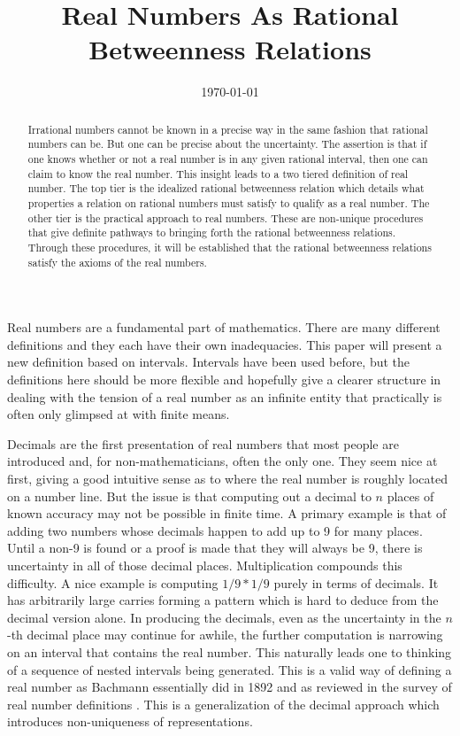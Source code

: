 \documentclass[12pt]{article}
\title{Real Numbers As Rational Betweenness Relations}
\date{\today}
\begin{document}
\maketitle
\begin{abstract}
Irrational numbers cannot be known in a precise way in the same fashion that rational numbers can be. But one can be precise about the uncertainty. The assertion is that if one knows whether or not a real number is in any given rational interval, then one can claim to know the real number. This insight leads to a two tiered definition of real number. The top tier is the idealized rational betweenness relation which details what properties a relation on rational numbers must satisfy to qualify as a real number. The other tier is the practical approach to real numbers. These are non-unique procedures that give definite pathways to bringing forth the rational betweenness relations. Through these procedures, it will be established that the rational betweenness relations satisfy the axioms of the real numbers. 
\end{abstract}

Real numbers are a fundamental part of mathematics. There are many different definitions and they each have their own inadequacies. This paper will present a new definition based on intervals. Intervals have been used before, but the definitions here should be more flexible and hopefully give a clearer structure in dealing with the tension of a real number as an infinite entity that practically is often only glimpsed at with finite means. 

Decimals are the first presentation of real numbers that most people are introduced and, for non-mathematicians, often the only one. They seem nice at first, giving a good intuitive sense as to where the real number is roughly located on a number line. But the issue is that computing out a decimal to $n$ places of known accuracy may not be possible in finite time. A primary example is that of adding two numbers whose decimals happen to add up to 9 for many places. Until a non-9 is found or a proof is made that they will always be 9, there is uncertainty in all of those decimal places. Multiplication compounds this difficulty. A nice example is computing $1/9 * 1/9$ purely in terms of decimals. It has arbitrarily large carries forming a pattern which is hard to deduce from the decimal version alone. In producing the decimals, even as the uncertainty in the $n$-th decimal place may continue for awhile, the further computation is narrowing on an interval that contains the real number. This naturally leads one to thinking of a sequence of nested intervals being generated. This is a valid way of defining a real number as Bachmann essentially did in 1892 and as reviewed in the survey of real number definitions \cite{ittay-2015}. This is a generalization of the decimal approach which introduces non-uniqueness of representations. 
\end{document}
